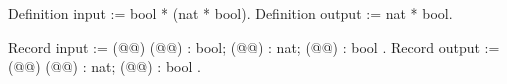 Definition input :=
  bool * (nat * bool).
Definition output :=
  nat * bool.

Record input :=
  (@@) { (@@) : bool; (@@) : nat; (@@) : bool }.
Record output :=
  (@@) { (@@) : nat; (@@) : bool }.
